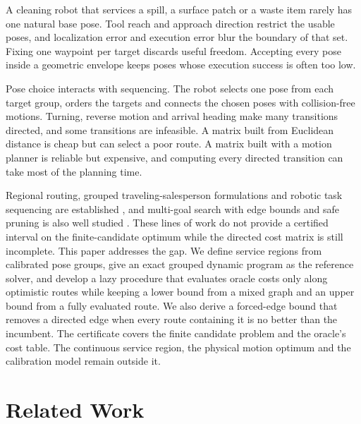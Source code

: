 \documentclass[conference]{IEEEtran}
\begin{document}
A cleaning robot that services a spill, a surface patch or a waste item rarely has one natural base pose. Tool reach and approach direction restrict the usable poses, and localization error and execution error blur the boundary of that set. Fixing one waypoint per target discards useful freedom. Accepting every pose inside a geometric envelope keeps poses whose execution success is often too low.

Pose choice interacts with sequencing. The robot selects one pose from each target group, orders the targets and connects the chosen poses with collision-free motions. Turning, reverse motion and arrival heading make many transitions directed, and some transitions are infeasible. A matrix built from Euclidean distance is cheap but can select a poor route. A matrix built with a motion planner is reliable but expensive, and computing every directed transition can take most of the planning time.

Regional routing, grouped traveling-salesperson formulations and robotic task sequencing are established \cite{isaacs2013,ishida2019,nedjati2020,suare2020}, and multi-goal search with edge bounds and safe pruning is also well studied \cite{chandak2024}. These lines of work do not provide a certified interval on the finite-candidate optimum while the directed cost matrix is still incomplete. This paper addresses the gap. We define service regions from calibrated pose groups, give an exact grouped dynamic program as the reference solver, and develop a lazy procedure that evaluates oracle costs only along optimistic routes while keeping a lower bound from a mixed graph and an upper bound from a fully evaluated route. We also derive a forced-edge bound that removes a directed edge when every route containing it is no better than the incumbent. The certificate covers the finite candidate problem and the oracle's cost table. The continuous service region, the physical motion optimum and the calibration model remain outside it.

\section{Related Work}
\end{document}
